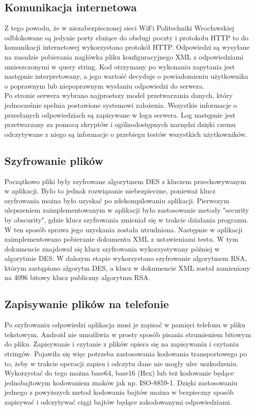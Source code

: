 \documentclass[archivemod, eng]{mgr}
\begin{document}
			\subsection{Komunikacja internetowa}
			
			Z tego powodu, że w niezabezpieczonej sieci WiFi Politechniki Wrocławskiej odblokowane są jedynie porty służące do obsługi poczty i protokołu HTTP to do komunikacji internetowej wykorzystano protokół HTTP. Odpowiedzi są wysyłane na zasadzie pobierania nagłówka pliku konfiguracyjnego XML z odpowiedziami umieszczonymi w query string. Kod otrzymany po wykonaniu zapytania jest następnie interpretowany, a jego wartość decyduje o powiadomieniu użytkownika o poprawnym lub niepoprawnym wysłaniu odpowiedzi do serwera.\\
			
			Po stronie serwera wybrano najprostszy model przetwarzania danych, który jednocześnie spełnia postawione systemowi założenia. Wszystkie informacje o przesłanych odpowiedziach są zapisywane w logu serwera. Log następnie jest przetwarzany za pomocą skryptów i ogólnodostępnych narzędzi dzięki czemu odczytywane z niego są informacje o przebiegu testów wszystkich użytkowników.
		
			\subsection{Szyfrowanie plików}
		
			Początkowo pliki były szyfrowane algorytmem DES z kluczem przechowywanym w aplikacji. Było to jednak rozwiązanie niebezpieczne, ponieważ klucz szyfrowania można było uzyskać po zdekompilowaniu aplikacji. Pierwszym ulepszeniem zaimplementowanym w aplikacji było zastosowanie metody "security by obscurity", gdzie klucz szyfrowania zmieniał się w trakcie działania programu. W ten sposób sprawa jego uzyskania została utrudniona. Następnie w aplikacji zaimplementowano pobieranie dokumentu XML z ustawieniami testu. W tym dokumencie znajdował się klucz szyfrowania wykorzystywany później w algorytmie DES. W dalszym etapie wykorzystano szyfrowanie algorytmem RSA, którym zastąpiono algorytm DES, a klucz w dokumencie XML został zamieniony na 4096 bitowy klucz publiczny algorytmu RSA.
			
			\subsection{Zapisywanie plików na telefonie}
			
			Po szyfrowaniu odpowiedzi aplikacja musi je zapisać w pamięci telefonu w pliku tekstowym. Android nie umożliwia w prosty sposób pisania strumieniem bitowym do pliku. Zapisywanie i czytanie z plików opiera się na zapisywaniu i czytaniu stringów. Pojawiła się więc potrzeba zastosowania kodowania transportowego po to, żeby w trakcie operacji zapisu i odczytu dane nie mogły ulec uszkodzeniu. Wykorzystać do tego można base64, base16 (Hex) lub też kodowanie będące jednobajtowym kodowaniem znaków jak np. ISO-8859-1. Dzięki zastosowaniu jednego z powyższych metod kodowania bajtów można w bezpieczny sposób zapisywać i odczytywać ciągi bajtów będące zakodowanymi odpowiedziami.
		
\end{document}
